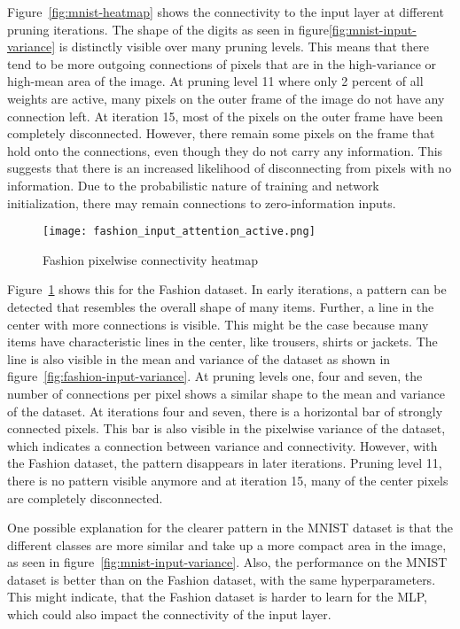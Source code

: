 Figure~\ref{fig:mnist-heatmap} shows the connectivity to the input layer at different pruning iterations.
The shape of the digits as seen in figure\ref{fig:mnist-input-variance} is distinctly visible over many pruning levels.
This means that there tend to be more outgoing connections of pixels that are in the high-variance or high-mean area of the image.
At pruning level 11 where only 2 percent of all weights are active, many pixels on the outer frame of the image do not have any connection left.
At iteration 15, most of the pixels on the outer frame have been completely disconnected.
However, there remain some pixels on the frame that hold onto the connections, even though they do not carry any information.
This suggests that there is an increased likelihood of disconnecting from pixels with no information.
Due to the probabilistic nature of training and network initialization, there may remain connections to zero-information inputs.

\begin{figure}[ht] %
    \centering\texttt{[image: fashion\_input\_attention\_active.png]}
    \caption{Fashion pixelwise connectivity heatmap}\label{fig:fashion-heatmap}
\end{figure}

Figure~\ref{fig:fashion-heatmap} shows this for the Fashion dataset.
In early iterations, a pattern can be detected that resembles the overall shape of many items.
Further, a line in the center with more connections is visible.
This might be the case because many items have characteristic lines in the center, like trousers, shirts or jackets.
The line is also visible in the mean and variance of the dataset as shown in figure~\ref{fig:fashion-input-variance}.
At pruning levels one, four and seven, the number of connections per pixel shows a similar shape to the mean and variance of the dataset.
At iterations four and seven, there is a horizontal bar of strongly connected pixels. 
This bar is also visible in the pixelwise variance of the dataset, which indicates a connection between variance and connectivity.
However, with the Fashion dataset, the pattern disappears in later iterations.
Pruning level 11, there is no pattern visible anymore and at iteration 15, many of the center pixels are completely disconnected.

One possible explanation for the clearer pattern in the MNIST dataset is that the different classes are more similar and take up a more compact area in the image, as seen in figure~\ref{fig:mnist-input-variance}.
Also, the performance on the MNIST dataset is better than on the Fashion dataset, with the same hyperparameters.
This might indicate, that the Fashion dataset is harder to learn for the {MLP}, which could also impact the connectivity of the input layer.

